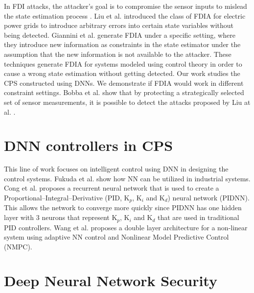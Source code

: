 In FDI attacks, the attacker's goal is to compromise the sensor inputs to mislead the state estimation process \cite{e3f0020abba24d4389aff937fe8bcdd5}. Liu et al. \cite{10.1145/1952982.1952995} introduced the class of FDIA for electric power grids to introduce arbitrary errors into certain state variables without being detected. Giannini et al. \cite{unknown} generate FDIA under a specific setting, 
where they introduce new information as constraints in the state estimator under the assumption that the new information is not available to the attacker. These techniques generate FDIA for systems modeled using control theory in order to cause a wrong state estimation without getting detected. Our work studies the CPS constructed using \ac{DNN}s. We demonstrate if  \ac{FDIA} would work in different constraint settings. 
Bobba et al. \cite{Bobba2010DetectingFD} show that by protecting a strategically selected set of sensor measurements, it is possible to detect the attacks proposed by Liu at al. \cite{10.1145/1952982.1952995}.

\section{DNN controllers in CPS}
This line of work focuses on intelligent control using \ac{DNN} in designing the control systems. %
Fukuda et al. \cite{170966} show how NN can be utilized in industrial systems. Cong et al. \cite{Cong} proposes a recurrent neural network that is used to create a Proportional–Integral–Derivative (PID, K$_p$, K$_i$ and K$_d$)  neural network (PIDNN). 
This allows the network to converge more quickly since PIDNN has one hidden layer with 3 neurons that represent K$_p$, K$_i$ and K$_d$ that are used in traditional PID controllers. Wang et al. \cite{Wang2016ACA} proposes a double layer architecture for a non-linear system using adaptive NN control and Nonlinear Model Predictive Control (NMPC).

\section{Deep Neural Network Security}

